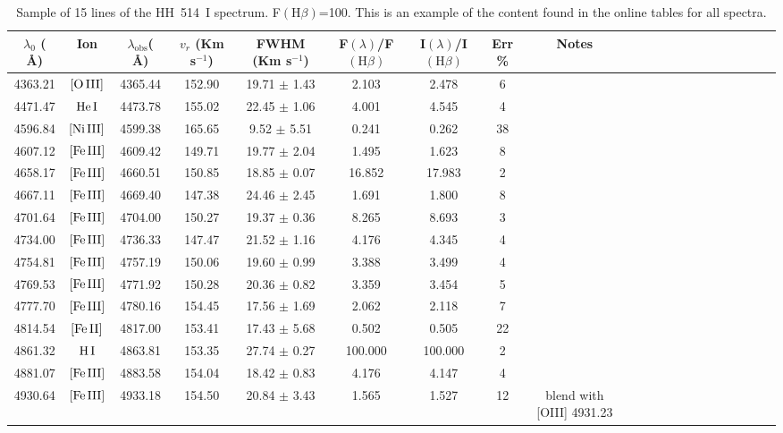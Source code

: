 \documentclass[fleqn,usenatbib]{mnras}
\begin{document}
\begin{table}
\caption{Sample of 15 lines of the HH~514~I spectrum. F$\left( \mbox{H}\beta \right)$=100. This is an example of the content found in the online tables for all spectra.}
\label{tab:sample_spectra}
\begin{tabular}{ccccccccccccccccccccc}
\hline
$\lambda_0$ ( \AA ) & Ion & $\lambda_{\text{obs}}$( \AA ) & $v_r$ (Km s$^{-1}$) & FWHM (Km s$^{-1}$) & F$\left( \lambda \right)$/F$\left( \mbox{H}\beta \right)$ & I$\left( \lambda \right)$/I$\left( \mbox{H}\beta \right)$ & Err \% & Notes \\
\hline
4363.21 & $\mbox{[O}\thinspace \mbox{III]}$ & 4365.44 & 152.90 & 19.71 $\pm$ 1.43 & 2.103 & 2.478 & 6 &  \\
4471.47 & $\mbox{He}\thinspace \mbox{I}$ & 4473.78 & 155.02 & 22.45 $\pm$ 1.06 & 4.001 & 4.545 & 4 &  \\
4596.84 & $\mbox{[Ni}\thinspace \mbox{III]}$ & 4599.38 & 165.65 & 9.52 $\pm$ 5.51 & 0.241 & 0.262 & 38 &  \\
4607.12 & $\mbox{[Fe}\thinspace \mbox{III]}$ & 4609.42 & 149.71 & 19.77 $\pm$ 2.04 & 1.495 & 1.623 & 8 &  \\
4658.17 & $\mbox{[Fe}\thinspace \mbox{III]}$ & 4660.51 & 150.85 & 18.85 $\pm$ 0.07 & 16.852 & 17.983 & 2 &  \\
4667.11 & $\mbox{[Fe}\thinspace \mbox{III]}$ & 4669.40 & 147.38 & 24.46 $\pm$ 2.45 & 1.691 & 1.800 & 8 &  \\
4701.64 & $\mbox{[Fe}\thinspace \mbox{III]}$ & 4704.00 & 150.27 & 19.37 $\pm$ 0.36 & 8.265 & 8.693 & 3 &  \\
4734.00 & $\mbox{[Fe}\thinspace \mbox{III]}$ & 4736.33 & 147.47 & 21.52 $\pm$ 1.16 & 4.176 & 4.345 & 4 &  \\
4754.81 & $\mbox{[Fe}\thinspace \mbox{III]}$ & 4757.19 & 150.06 & 19.60 $\pm$ 0.99 & 3.388 & 3.499 & 4 &  \\
4769.53 & $\mbox{[Fe}\thinspace \mbox{III]}$ & 4771.92 & 150.28 & 20.36 $\pm$ 0.82 & 3.359 & 3.454 & 5 &  \\
4777.70 & $\mbox{[Fe}\thinspace \mbox{III]}$ & 4780.16 & 154.45 & 17.56 $\pm$ 1.69 & 2.062 & 2.118 & 7 &  \\
4814.54 & $\mbox{[Fe}\thinspace \mbox{II]}$ & 4817.00 & 153.41 & 17.43 $\pm$ 5.68 & 0.502 & 0.505 & 22 &  \\
4861.32 & $\mbox{H}\thinspace \mbox{I}$ & 4863.81 & 153.35 & 27.74 $\pm$ 0.27 & 100.000 & 100.000 & 2 &  \\
4881.07 & $\mbox{[Fe}\thinspace \mbox{III]}$ & 4883.58 & 154.04 & 18.42 $\pm$ 0.83 & 4.176 & 4.147 & 4 &  \\
4930.64 & $\mbox{[Fe}\thinspace \mbox{III]}$ & 4933.18 & 154.50 & 20.84 $\pm$ 3.43 & 1.565 & 1.527 & 12 &  blend with [O\thinspace III] 4931.23 \\
\hline
\end{tabular}
\end{table}
\end{document}
